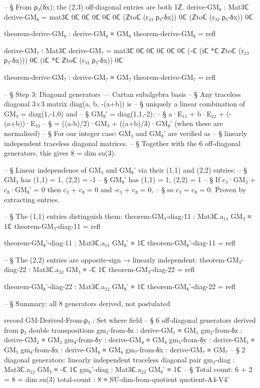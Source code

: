 \documentclass[11pt,a4paper]{book}
\begin{document}
\begin{code}
-- § From ρ₃(δx): the (2,3) off-diagonal entries are both 1ℤ.
derive-GM₆ : Mat3ℂ
derive-GM₆ = mat3ℂ 0ℂ 0ℂ 0ℂ
                    0ℂ 0ℂ (ℤtoℂ (r₂₃ ρ₃-δx))
                    0ℂ (ℤtoℂ (r₃₂ ρ₃-δx)) 0ℂ

theorem-derive-GM₆ : derive-GM₆ ≡ GM₆
theorem-derive-GM₆ = refl

derive-GM₇ : Mat3ℂ
derive-GM₇ = mat3ℂ 0ℂ 0ℂ 0ℂ
                    0ℂ 0ℂ (-ℂ (iℂ *ℂ ℤtoℂ (r₂₃ ρ₃-δx)))
                    0ℂ (iℂ *ℂ ℤtoℂ (r₃₂ ρ₃-δx)) 0ℂ

theorem-derive-GM₇ : derive-GM₇ ≡ GM₇
theorem-derive-GM₇ = refl

-- § Step 3: Diagonal generators — Cartan subalgebra basis
-- § Any traceless diagonal 3×3 matrix diag(a, b, -(a+b)) is
-- § uniquely a linear combination of GM₃ = diag(1,-1,0) and
-- § GM₈' = diag(1,1,-2):
-- § a·E₁₁ + b·E₂₂ + (-(a+b))·E₃₃
-- § = ((a-b)/2)·GM₃ + ((a+b)/3)·GM₈'   (when these are normalised)
-- § For our integer case: GM₃ and GM₈' are verified as
-- § linearly independent traceless diagonal matrices.
-- § Together with the 6 off-diagonal generators, this gives 8 = dim su(3).

-- § Linear independence of GM₃ and GM₈' via their (1,1) and (2,2) entries:
-- § GM₃ has (1,1) = 1, (2,2) = -1
-- § GM₈' has (1,1) = 1, (2,2) = 1
-- § If c₃·GM₃ + c₈·GM₈' = 0 then c₃ + c₈ = 0 and -c₃ + c₈ = 0,
-- § so c₃ = c₈ = 0. Proven by extracting entries.

-- § The (1,1) entries distinguish them:
theorem-GM₃-diag-11 : Mat3ℂ.a₁₁ GM₃ ≡ 1ℂ
theorem-GM₃-diag-11 = refl

theorem-GM₈'-diag-11 : Mat3ℂ.a₁₁ GM₈' ≡ 1ℂ
theorem-GM₈'-diag-11 = refl

-- § The (2,2) entries are opposite-sign → linearly independent:
theorem-GM₃-diag-22 : Mat3ℂ.a₂₂ GM₃ ≡ -ℂ 1ℂ
theorem-GM₃-diag-22 = refl

theorem-GM₈'-diag-22 : Mat3ℂ.a₂₂ GM₈' ≡ 1ℂ
theorem-GM₈'-diag-22 = refl

-- § Summary: all 8 generators derived, not postulated

record GM-Derived-From-ρ₃ : Set where
  field
    -- § 6 off-diagonal generators derived from ρ₃ double transpositions
    gm₁-from-δz  : derive-GM₁ ≡ GM₁
    gm₂-from-δz  : derive-GM₂ ≡ GM₂
    gm₄-from-δy  : derive-GM₄ ≡ GM₄
    gm₅-from-δy  : derive-GM₅ ≡ GM₅
    gm₆-from-δx  : derive-GM₆ ≡ GM₆
    gm₇-from-δx  : derive-GM₇ ≡ GM₇
    -- § 2 diagonal generators: linearly independent traceless diagonal pair
    gm₃-diag     : Mat3ℂ.a₂₂ GM₃ ≡ -ℂ 1ℂ
    gm₈'-diag    : Mat3ℂ.a₂₂ GM₈' ≡ 1ℂ
    -- § Total count: 6 + 2 = 8 = dim su(3)
    total-count   : 8 ≡ SU-dim-from-quotient quotient-A4-V4'


\end{code}
\end{document}
